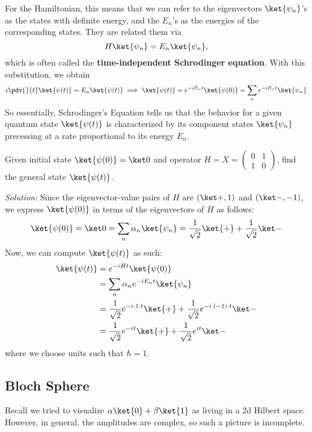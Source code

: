 For the Hamiltonian, this means that we can refer to the eigenvectors $\ket{\psi_n}$'s as the states with definite energy, and the $E_n$'s as the energies of the corresponding states. They are related them via
\[ H \ket{\psi_n} = E_n \ket{\psi_n},\]
which is often called the \textbf{time-independent Schrodinger equation}. With this substitution, we obtain
\[ i \pdv{}{t} \ket{\psi(t)} = E_n \ket{\psi(t)} \implies \ket{\psi(t)} = e^{-i E_n t} \ket{\psi(0)} = \sum_n e^{-i E_n t} \ket{\psi_n} \]
So essentially, Schrodinger's Equation tells us that the behavior for a given quantum state $\ket{\psi(t)}$ is characterized by its component states $\ket{\psi_n}$ precessing at a rate proportional to its energy $E_n$. 

\begin{example}
    Given initial state $\ket{\psi(0)} = \ket 0$ and operator $H = X = \begin{pmatrix}
        0 & 1 \\
        1 & 0 
    \end{pmatrix}$, find the general state $\ket{\psi(t)}$.

    \emph{Solution:} Since the eigenvector-value pairs of $H$ are $(\ket+, 1)$ and $(\ket-, -1)$, we express $\ket{\psi(0)}$ in terms of the eigenvectors of $H$ as follows:
    \[\ket{\psi(0)} = \ket 0 = \sum_n \alpha_n \ket{\psi_n} = \frac{1}{\sqrt{2}} \ket{+} + \frac{1}{\sqrt{2}} \ket -\]
    Now, we can compute $\ket{\psi(t)}$ as such:
    \begin{align*}
        \ket{\psi(t)} &= e^{-i H t} \ket{\psi(0)} \\
        &= \sum_n \alpha_n e^{-i E_n t} \ket{\psi_n} \\
        &= \frac{1}{\sqrt{2}} e^{-i \cdot 1 \cdot t} \ket{+} + \frac{1}{\sqrt{2}}e^{-i \cdot (-1) \cdot t} \ket - \\
        &= \frac{1}{\sqrt{2}} e^{-it} \ket{+} + \frac{1}{\sqrt{2}}e^{it} \ket -
    \end{align*}
    where we choose units such that $\hbar = 1$.
\end{example}
\subsection{Bloch Sphere}
Recall we tried to visualize $\alpha\ket{0} + \beta\ket{1}$ as living in a 2d Hilbert space. However, in general, the amplitudes are
complex, so such a picture is incomplete.

